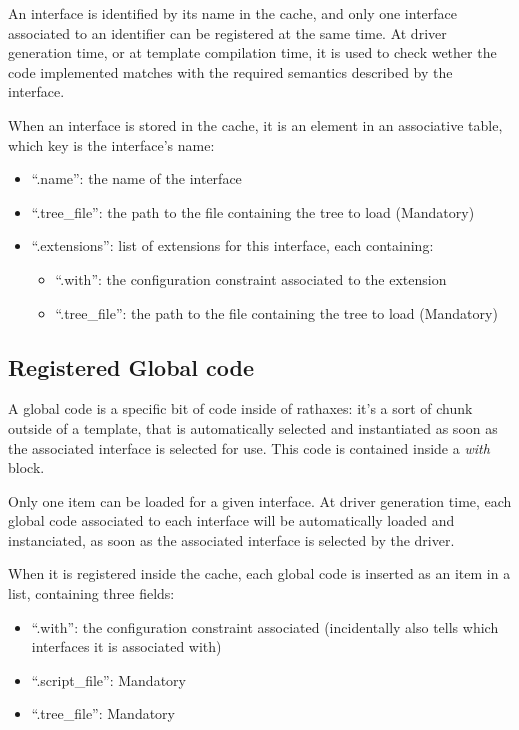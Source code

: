 \documentclass[american]{rtxreport}
\begin{document}
An interface is identified by its name in the cache, and only one interface
associated to an identifier can be registered at the same time. At driver
generation time, or at template compilation time, it is used to check wether
the code implemented matches with the required semantics described by
the interface.

When an interface is stored in the cache, it is an element in an associative
table, which key is the interface's name:
\begin{itemize}
    \item ``.name'': the name of the interface
    \item ``.tree\_file'': the path to the file containing the tree to load
        (Mandatory)
    \item ``.extensions'': list of extensions for this interface, each
        containing:
        \begin{itemize}
            \item ``.with'': the configuration constraint associated to the
                extension
            \item ``.tree\_file'': the path to the file containing the tree
                to load (Mandatory)
        \end{itemize}
\end{itemize}


\subsection{Registered Global code}

A global code is a specific bit of code inside of rathaxes: it's a sort of
chunk outside of a template, that is automatically selected and instantiated as
soon as the associated interface is selected for use. This code is contained
inside a \emph{with} block.

Only one item can be loaded for a given interface. At driver generation time,
each global code associated to each interface will be automatically loaded and
instanciated, as soon as the associated interface is selected by the driver.

When it is registered inside the cache, each global code is inserted as an item
in a list, containing three fields:
\begin{itemize}
    \item ``.with'': the configuration constraint associated (incidentally also
            tells which interfaces it is associated with)
    \item ``.script\_file'': Mandatory
    \item ``.tree\_file'': Mandatory
\end{itemize}
\end{document}
